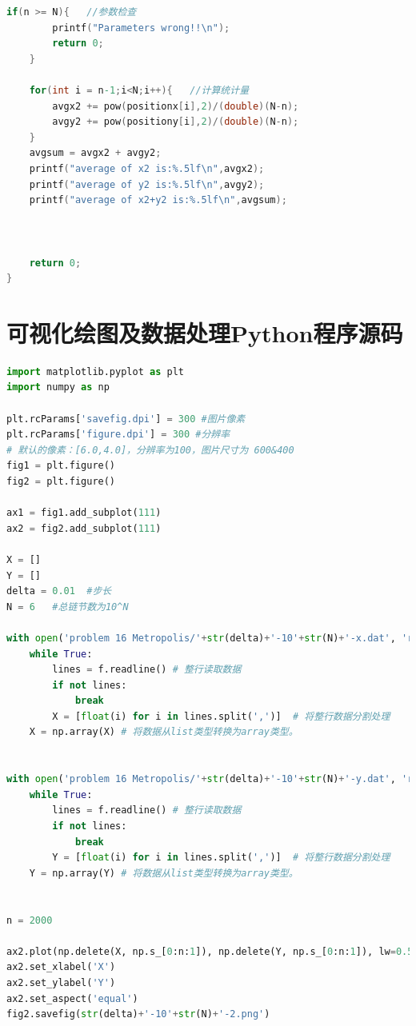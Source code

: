 \documentclass[a4paper,11pt]{article}
\begin{document}
\begin{appendices}
\begin{lstlisting}[language = C]
    if(n >= N){   //参数检查
        printf("Parameters wrong!!\n");
        return 0;
    }
    
    for(int i = n-1;i<N;i++){   //计算统计量
        avgx2 += pow(positionx[i],2)/(double)(N-n);
        avgy2 += pow(positiony[i],2)/(double)(N-n);
    }
    avgsum = avgx2 + avgy2;
    printf("average of x2 is:%.5lf\n",avgx2);
    printf("average of y2 is:%.5lf\n",avgy2);
    printf("average of x2+y2 is:%.5lf\n",avgsum);
    
   
    
    return 0;
}

\end{lstlisting}

\newpage

\section{可视化绘图及数据处理Python程序源码}
\begin{lstlisting}[language = python]
import matplotlib.pyplot as plt
import numpy as np

plt.rcParams['savefig.dpi'] = 300 #图片像素
plt.rcParams['figure.dpi'] = 300 #分辨率
# 默认的像素：[6.0,4.0]，分辨率为100，图片尺寸为 600&400
fig1 = plt.figure()
fig2 = plt.figure()

ax1 = fig1.add_subplot(111)
ax2 = fig2.add_subplot(111)

X = []
Y = []
delta = 0.01  #步长
N = 6   #总链节数为10^N

with open('problem 16 Metropolis/'+str(delta)+'-10'+str(N)+'-x.dat', 'r') as f:
    while True:
        lines = f.readline() # 整行读取数据
        if not lines:
            break
        X = [float(i) for i in lines.split(',')]  # 将整行数据分割处理
    X = np.array(X) # 将数据从list类型转换为array类型。


with open('problem 16 Metropolis/'+str(delta)+'-10'+str(N)+'-y.dat', 'r') as f:
    while True:
        lines = f.readline() # 整行读取数据
        if not lines:
            break
        Y = [float(i) for i in lines.split(',')]  # 将整行数据分割处理
    Y = np.array(Y) # 将数据从list类型转换为array类型。


n = 2000

ax2.plot(np.delete(X, np.s_[0:n:1]), np.delete(Y, np.s_[0:n:1]), lw=0.5)
ax2.set_xlabel('X')
ax2.set_ylabel('Y')
ax2.set_aspect('equal')
fig2.savefig(str(delta)+'-10'+str(N)+'-2.png')
\end{lstlisting}


\end{appendices}
\end{document}
